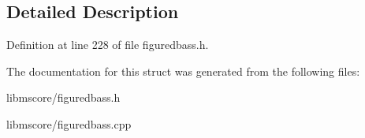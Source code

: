 \subsection{Detailed Description}


Definition at line 228 of file figuredbass.\+h.



The documentation for this struct was generated from the following files\+:\begin{DoxyCompactItemize}
\item 
libmscore/figuredbass.\+h\item 
libmscore/figuredbass.\+cpp\end{DoxyCompactItemize}
